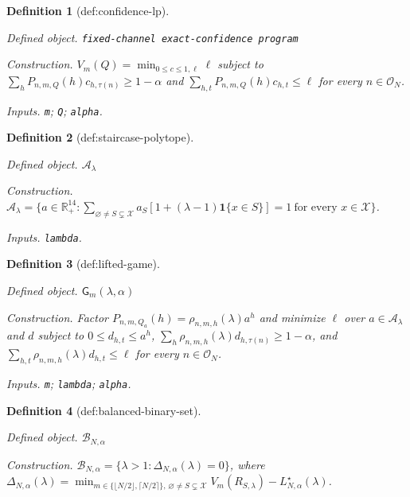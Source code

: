 \documentclass{article}
\newtheorem{definition}{Definition}
\begin{document}
\begin{definition}[def:confidence-lp]\label{def:confidence-lp}
\par\smallskip\noindent\emph{Defined object.} \texttt{fixed-\allowbreak{}channel exact-\allowbreak{}confidence program}
\par\smallskip\noindent\emph{Construction.} \(V_m(Q)=\min_{0\le c\le1,\ell}\ell\) subject to \(\sum_hP_{n,m,Q}(h)c_{h,\tau(n)}\ge1-\alpha\) and \(\sum_{h,t}P_{n,m,Q}(h)c_{h,t}\le\ell\) for every \(n\in\mathcal O_N\).
\par\smallskip\noindent\emph{Inputs.} \texttt{m}; \texttt{Q}; \texttt{alpha}.
\end{definition}

\begin{definition}[def:staircase-polytope]\label{def:staircase-polytope}
\par\smallskip\noindent\emph{Defined object.} \(\mathcal A_\lambda\)
\par\smallskip\noindent\emph{Construction.} \(\mathcal A_\lambda=\{a\in\mathbb R_+^{14}:\sum_{\varnothing\ne S\subsetneq\mathcal X}a_S[1+(\lambda-1)\mathbf 1\{x\in S\}]=1\ \text{for every }x\in\mathcal X\}\).
\par\smallskip\noindent\emph{Inputs.} \texttt{lambda}.
\end{definition}

\begin{definition}[def:lifted-game]\label{def:lifted-game}
\par\smallskip\noindent\emph{Defined object.} \(\mathsf G_m(\lambda,\alpha)\)
\par\smallskip\noindent\emph{Construction.} Factor \(P_{n,m,Q_a}(h)=\rho_{n,m,h}(\lambda)a^h\) and minimize \(\ell\) over \(a\in\mathcal A_\lambda\) and \(d\) subject to \(0\le d_{h,t}\le a^h\), \(\sum_h\rho_{n,m,h}(\lambda)d_{h,\tau(n)}\ge1-\alpha\), and \(\sum_{h,t}\rho_{n,m,h}(\lambda)d_{h,t}\le\ell\) for every \(n\in\mathcal O_N\).
\par\smallskip\noindent\emph{Inputs.} \texttt{m}; \texttt{lambda}; \texttt{alpha}.
\end{definition}

\begin{definition}[def:balanced-binary-set]\label{def:balanced-binary-set}
\par\smallskip\noindent\emph{Defined object.} \(\mathcal B_{N,\alpha}\)
\par\smallskip\noindent\emph{Construction.} \(\mathcal B_{N,\alpha}=\{\lambda>1:\Delta_{N,\alpha}(\lambda)=0\}\), where \(\Delta_{N,\alpha}(\lambda)=\min_{m\in\{\lfloor N/2\rfloor,\lceil N/2\rceil\},\,\varnothing\ne S\subsetneq\mathcal X}V_m(R_{S,\lambda})-L^\star_{N,\alpha}(\lambda)\).
\end{definition}
\end{document}

